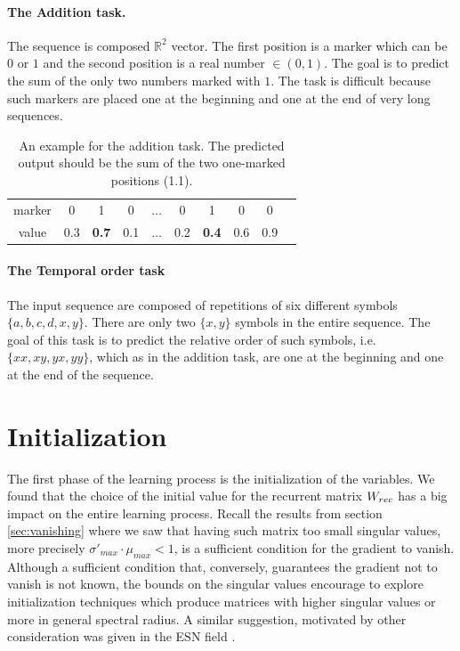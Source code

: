 \paragraph{The Addition task.}
The sequence is composed $\mathbb{R}^2$ vector. The first position is a marker which can be $0$ or $1$ and the second position is a real number $\in (0,1)$. The goal is to predict the sum of the only two numbers marked with $1$. The task is difficult because such markers are placed one at the beginning and one at the end of very long sequences.

\begin{table}[h]
	\centering
\begin{tabular}{|c|c|c|c|c|c|c|c|c|c}
	\hline  marker & 0&  1&  0&  $\hdots$& 0 & 1 & 0 & 0  \\ 
	value & 0.3&  \textbf{0.7}&  0.1&  $\hdots$& 0.2& \textbf{0.4} & 0.6& 0.9  \\ 
	\hline 
\end{tabular}
\caption{An example for the addition task. The predicted output should be the sum of the two one-marked positions (1.1). }
\label{table:add_example}
\end{table}


\paragraph{The Temporal order task}
The input sequence are composed of repetitions of six different symbols $\{a, b, c, d , x, y\}$.
There are only two $\{x, y\}$ symbols in the entire sequence. The goal of this task is to predict the relative order of such symbols, i.e. $\{xx, xy, yx, yy\}$, which as in the addition task, are one at the beginning and one at the end of the sequence.


\section{Initialization}
The first phase of the learning process is the initialization of the variables. We found that the choice of the initial value for the recurrent matrix $W_{rec}$ has a big impact on the entire learning process. Recall the results from section  \ref{sec:vanishing} where we saw that having such matrix too small singular values, more precisely $\sigma'_{max} \cdot \mu_{max} <1 $, is a sufficient condition for the gradient to vanish. Although a sufficient condition that, conversely, guarantees the gradient not to vanish is not known, the bounds on the singular values encourage to explore initialization techniques which produce matrices with higher singular values or more in general spectral radius. A similar suggestion, motivated by other consideration was given in the ESN field \cite{reservoirSummary}.

